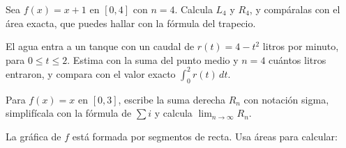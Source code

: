 \documentclass[11pt,a4paper]{article}
\begin{document}
\taller
\begin{ejercicios}
\item Sea $f(x)=x+1$ en $[0,4]$ con $n=4$. Calcula $L_4$ y $R_4$, y compáralas con el área exacta, que puedes hallar
  con la fórmula del trapecio.
\item El agua entra a un tanque con un caudal de $r(t)=4-t^{2}$ litros por minuto, para $0\le t\le2$. Estima con la
  suma del punto medio y $n=4$ cuántos litros entraron, y compara con el valor exacto $\int_0^2 r(t)\,dt$.
\item Para $f(x)=x$ en $[0,3]$, escribe la suma derecha $R_n$ con notación sigma, simplifícala con la fórmula de
  $\sum i$ y calcula $\lim_{n\to\infty}R_n$.
\item La gráfica de $f$ está formada por segmentos de recta. Usa áreas para calcular:


\end{ejercicios}
\end{document}
